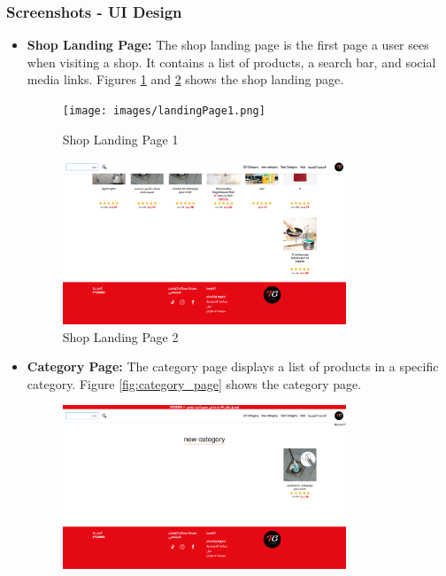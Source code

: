 \subsubsection{Screenshots - UI Design}

\begin{itemize}
    \item \textbf{Shop Landing Page:} The shop landing page is the first page a user sees when visiting a shop. It contains a list of products, a search bar, and social media links. Figures \ref{fig:shop_landing_page_one} and \ref{fig:shop_landing_page_two} shows the shop landing page.
    \begin{figure}[H]
        \centering
        \texttt{[image: images/landingPage1.png]}
        \caption{Shop Landing Page 1}
        \label{fig:shop_landing_page_one}
    \end{figure}
    \begin{figure}[H]
        \centering
        \includegraphics[width=0.8\textwidth]{images/landingPage2.png}
        \caption{Shop Landing Page 2}
        \label{fig:shop_landing_page_two}
    \end{figure}
    \item \textbf{Category Page:} The category page displays a list of products in a specific category. Figure \ref{fig:category_page} shows the category page.
    \begin{figure}[H]
        \centering
        \includegraphics[width=0.8\textwidth]{images/categoryPage.png}

\end{figure}
\end{itemize}
